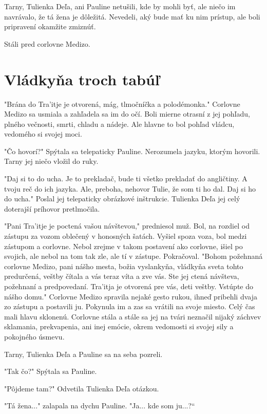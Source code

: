 \documentclass{book}
\begin{document}
Tarny, Tulienka Deľa, ani Pauline netušili, kde by mohli byť, ale niečo im navrávalo, že tá žena je dôležitá. Nevedeli, aký bude mať ku nim prístup, ale boli pripravení okamžite zmiznúť.

Stáli pred corlovne Medizo.

\chapter{Vládkyňa troch tabúľ}

"$ $Brána do Tra'itje je otvorená, mág, tlmočníčka a polodémonka."$ $ Corlovne Medizo sa usmiala a zahľadela sa im do očí. Boli mierne otrasní z jej pohľadu, plného večnosti, smrti, chladu a nádeje. Ale hlavne to bol pohľad vládcu, vedomého si svojej moci.

"$ $Čo hovorí?"$ $ Spýtala sa telepaticky Pauline. Nerozumela jazyku, ktorým hovorili. Tarny jej niečo vložil do ruky.

"$ $Daj si to do ucha. Je to prekladač, bude ti všetko prekladať do angličtiny. A tvoju reč do ich jazyka. Ale, preboha, nehovor Tulie, že som ti ho dal. Daj si ho do ucha."$ $ Poslal jej telepaticky obrázkové inštrukcie. Tulienka Deľa jej celý doterajší príhovor pretlmočila.

"$ $Pani Tra'itje je poctená vašou návštevou,"$ $ predniesol muž. Bol, na rozdiel od zástupu za vozom oblečený v honosných šatách. Vyšiel spoza voza, bol medzi zástupom a corlovne. Nebol zrejme v takom postavení ako corlovne, išiel po svojich, ale nebol na tom tak zle, ale tí v zástupe. Pokračoval. "$ $Bohom požehnaná corlovne Medizo, pani nášho mesta, božia vyslankyňa, vládkyňa sveta tohto predurčená, veštby čítala a vás teraz víta a zve vás. Ste jej ctená návšteva, požehnaní a predpovedaní. Tra'itja je otvorená pre vás, deti veštby. Vstúpte do nášho domu."$ $ Corlovne Medizo spravila nejaké gesto rukou, ihneď pribehli dvaja zo zástupu a postavili ju. Pokynula im a zas sa vrátili na svoje miesto. Celý čas mali hlavu sklonenú. Corlovne stála a stále sa jej na tvári neznačil nijaký záchvev sklamania, prekvapenia, ani inej emócie, okrem vedomosti si svojej sily a pokojného úsmevu.

Tarny, Tulienka Deľa a Pauline sa na seba pozreli.

"$ $Tak čo?"$ $ Spýtala sa Pauline.

"$ $Pôjdeme tam?"$ $ Odvetila Tulienka Deľa otázkou.

"$ $Tá žena..."$ $ zalapala na dychu Pauline. "$ $Ja... kde som ju...?“
\end{document}
